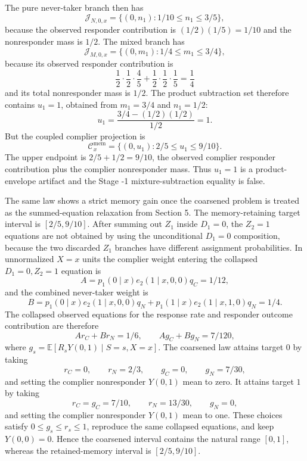 \documentclass[11pt]{article}
\newcommand{\E}{\mathbb{E}}
\theoremstyle{definition}
\theoremstyle{plain}
\theoremstyle{remark}
\begin{document}
The pure never-taker branch then has
\[
\mathcal J_{N,0,x}=\{(0,n_1):1/10\le n_1\le3/5\},
\]
because the observed responder contribution is \((1/2)(1/5)=1/10\) and the nonresponder mass is \(1/2\).  The mixed branch has
\[
\mathcal J_{M,0,x}=\{(0,m_1):1/4\le m_1\le3/4\},
\]
because its observed responder contribution is
\[
\frac12\cdot\frac12\cdot\frac45+\frac12\cdot\frac12\cdot\frac15=\frac14
\]
and its total nonresponder mass is \(1/2\).  The product subtraction set therefore contains \(u_1=1\), obtained from \(m_1=3/4\) and \(n_1=1/2\):
\[
u_1=\frac{3/4-(1/2)(1/2)}{1/2}=1.
\]
But the coupled complier projection is
\[
\mathcal C_x^{\mathrm{mem}}=\{(0,u_1):2/5\le u_1\le9/10\}.
\]
The upper endpoint is \(2/5+1/2=9/10\), the observed complier responder contribution plus the complier nonresponder mass.  Thus \(u_1=1\) is a product-envelope artifact and the Stage -1 mixture-subtraction equality is false.

The same law shows a strict memory gain once the coarsened problem is treated as the summed-equation relaxation from Section 5.  The memory-retaining target interval is \([2/5,9/10]\).  After summing out \(Z_1\) inside \(D_1=0\), the \(Z_2=1\) equations are not obtained by using the unconditional \(D_1=0\) composition, because the two discarded \(Z_1\) branches have different assignment probabilities.  In unnormalized \(X=x\) units the complier weight entering the collapsed \(D_1=0,Z_2=1\) equation is
\[
A=p_1(0\mid x)e_2(1\mid x,0,0)q_C=1/12,
\]
and the combined never-taker weight is
\[
B=p_1(0\mid x)e_2(1\mid x,0,0)q_N+p_1(1\mid x)e_2(1\mid x,1,0)q_N=1/4.
\]
The collapsed observed equations for the response rate and responder outcome contribution are therefore
\[
A r_C+B r_N=1/6,\qquad A g_C+B g_N=7/120,
\]
where \(g_s=\E[R_sY(0,1)\mid S=s,X=x]\).  The coarsened law attains target \(0\) by taking
\[
r_C=0,\qquad r_N=2/3,\qquad g_C=0,\qquad g_N=7/30,
\]
and setting the complier nonresponder \(Y(0,1)\) mean to zero.  It attains target \(1\) by taking
\[
r_C=g_C=7/10,\qquad r_N=13/30,\qquad g_N=0,
\]
and setting the complier nonresponder \(Y(0,1)\) mean to one.  These choices satisfy \(0\le g_s\le r_s\le1\), reproduce the same collapsed equations, and keep \(Y(0,0)=0\).  Hence the coarsened interval contains the natural range \([0,1]\), whereas the retained-memory interval is \([2/5,9/10]\).
\end{document}
